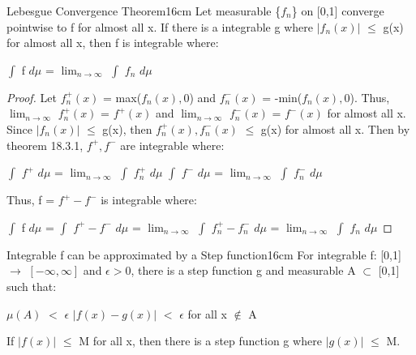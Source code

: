     \begin{wtheorem}{Lebesgue Convergence Theorem}{16cm}
        Let measurable \{$f_n$\} on [0,1] converge pointwise to f
        for almost all x. If there is a integrable g where
        $|f_n(x)|$ $\leq$ g(x) for almost all x, then f is integrable where:

        \hspace{0.5cm}
        $\int$ f $d\mu$ = $\lim_{n \rightarrow \infty}$ $\int$ $f_n$ $d\mu$
    \end{wtheorem}

    \begin{proof}
        Let $f_n^+(x)$ = max($f_n(x),0$) and $f_n^-(x)$ = -min($f_n(x),0$).
        Thus, $\lim_{n \rightarrow \infty}$ $f_n^+(x)$ = $f^+(x)$
        and $\lim_{n \rightarrow \infty}$ $f_n^-(x)$ = $f^-(x)$
        for almost all x.
        Since $|f_n(x)|$ $\leq$ g(x), then
        $f_n^+(x),f_n^-(x)$ $\leq$ g(x) for almost all x.
        Then by {\color{red} theorem 18.3.1}, $f^+,f^-$ are integrable where:

        \hspace{0.5cm}
        $\int$ $f^+$ $d\mu$
        = $\lim_{n \rightarrow \infty}$ $\int$ $f_n^+$ $d\mu$
        \hspace{1cm}
        $\int$ $f^-$ $d\mu$
        = $\lim_{n \rightarrow \infty}$ $\int$ $f_n^-$ $d\mu$

        Thus, f = $f^+ - f^-$ is integrable where:

        \hspace{0.5cm}
        $\int$ f $d\mu$
        = $\int$ $f^+ - f^-$ $d\mu$
        = $\lim_{n \rightarrow \infty}$ $\int$ $f_n^+ - f_n^-$ $d\mu$
        = $\lim_{n \rightarrow \infty}$ $\int$ $f_n$ $d\mu$
    \end{proof}

    \newpage



    \begin{wtheorem}{Integrable f can be approximated by a Step function}{16cm}
        For integrable f: [0,1] $\rightarrow$ $[-\infty,\infty]$
        and $\epsilon > 0$, there is a step function g
        and measurable A $\subset$ [0,1] such that:
        
        \hspace{0.5cm}
        $\mu(A)$ $<$ $\epsilon$
        \hspace{1cm}
        $|f(x) - g(x)|$ $<$ $\epsilon$
        for all x $\not \in$ A

        If $|f(x)|$ $\leq$ M for all x, then
        there is a step function g where $|g(x)|$ $\leq$ M.
    \end{wtheorem}

